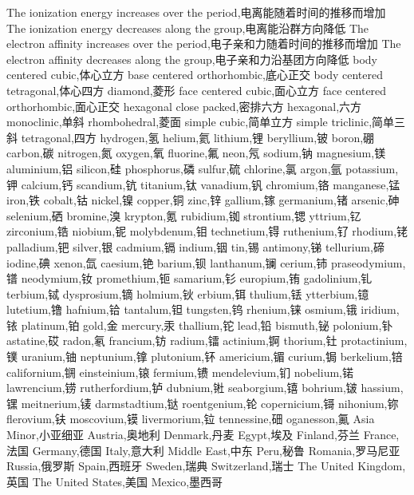 The ionization energy increases over the period,电离能随着时间的推移而增加
The ionization energy decreases along the group,电离能沿群方向降低
The electron affinity increases over the period,电子亲和力随着时间的推移而增加
The electron affinity decreases along the group,电子亲和力沿基团方向降低
body centered cubic,体心立方
base centered orthorhombic,底心正交
body centered tetragonal,体心四方
diamond,菱形
face centered cubic,面心立方
face centered orthorhombic,面心正交
hexagonal close packed,密排六方
hexagonal,六方
monoclinic,单斜
rhombohedral,菱面
simple cubic,简单立方
simple triclinic,简单三斜
tetragonal,四方
hydrogen,氢
helium,氦
lithium,锂
beryllium,铍
boron,硼
carbon,碳
nitrogen,氮
oxygen,氧
fluorine,氟
neon,氖
sodium,钠
magnesium,镁
aluminium,铝
silicon,硅
phosphorus,磷
sulfur,硫
chlorine,氯
argon,氩
potassium,钾
calcium,钙
scandium,钪
titanium,钛
vanadium,钒
chromium,铬
manganese,锰
iron,铁
cobalt,钴
nickel,镍
copper,铜
zinc,锌
gallium,镓
germanium,锗
arsenic,砷
selenium,硒
bromine,溴
krypton,氪
rubidium,铷
strontium,锶
yttrium,钇
zirconium,锆
niobium,铌
molybdenum,钼
technetium,锝
ruthenium,钌
rhodium,铑
palladium,钯
silver,银
cadmium,镉
indium,铟
tin,锡
antimony,锑
tellurium,碲
iodine,碘
xenon,氙
caesium,铯
barium,钡
lanthanum,镧
cerium,铈
praseodymium,镨
neodymium,钕
promethium,钷
samarium,钐
europium,铕
gadolinium,钆
terbium,铽
dysprosium,镝
holmium,钬
erbium,铒
thulium,铥
ytterbium,镱
lutetium,镥
hafnium,铪
tantalum,钽
tungsten,钨
rhenium,铼
osmium,锇
iridium,铱
platinum,铂
gold,金
mercury,汞
thallium,铊
lead,铅
bismuth,铋
polonium,钋
astatine,砹
radon,氡
francium,钫
radium,镭
actinium,锕
thorium,钍
protactinium,镤
uranium,铀
neptunium,镎
plutonium,钚
americium,镅
curium,锔
berkelium,锫
californium,锎
einsteinium,锿
fermium,镄
mendelevium,钔
nobelium,锘
lawrencium,铹
rutherfordium,𬬻
dubnium,𬭊
seaborgium,𬭳
bohrium,𬭛
hassium,𬭶
meitnerium,鿏
darmstadtium,𫟼
roentgenium,𬬭
copernicium,鿔
nihonium,鿭
flerovium,𫓧
moscovium,镆
livermorium,𫟷
tennessine,鿬
oganesson,鿫
Asia Minor,小亚细亚
Austria,奥地利
Denmark,丹麦
Egypt,埃及
Finland,芬兰
France,法国
Germany,德国
Italy,意大利
Middle East,中东
Peru,秘鲁
Romania,罗马尼亚
Russia,俄罗斯
Spain,西班牙
Sweden,瑞典
Switzerland,瑞士
The United Kingdom,英国
The United States,美国
Mexico,墨西哥
